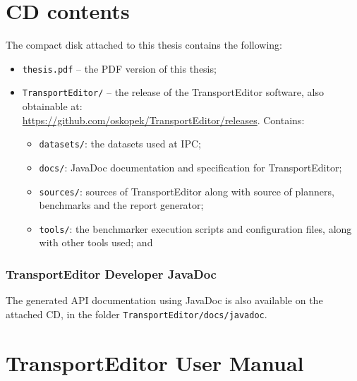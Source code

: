 

\section*{CD contents}\label{cd-contents}

The compact disk attached to this thesis contains the following:

\begin{itemize}
\item \verb+thesis.pdf+ -- the PDF version of this thesis;
\item \verb+TransportEditor/+ -- the  release of the TransportEditor software, also obtainable at:\\
\url{https://github.com/oskopek/TransportEditor/releases}. Contains:
\begin{itemize}
\item \verb+datasets/+: the datasets used at IPC;
\item \verb+docs/+: JavaDoc documentation and specification for TransportEditor;
\item \verb+sources/+: sources of TransportEditor along with source of planners, benchmarks and the report generator;
\item \verb+tools/+: the benchmarker execution scripts and configuration files, along with other tools used; and
\end{itemize}
\end{itemize}

\subsubsection*{TransportEditor Developer JavaDoc}\label{transporteditor-developer-javadoc}

The generated API documentation using JavaDoc is also available on the attached CD, in the folder
\verb+TransportEditor/docs/javadoc+.

\newpage

\section*{TransportEditor User Manual}\label{transporteditor-user-manual}


